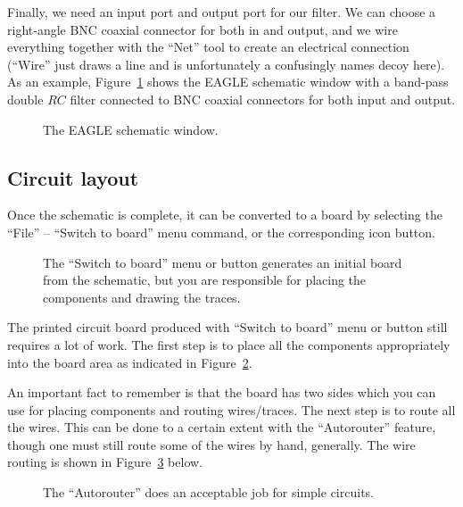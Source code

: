 \documentclass{article}
\begin{document}
Finally, we need an input port and output port for our filter.  We can choose a right-angle BNC coaxial connector for both in and output, and we wire everything together with the ``Net'' tool to create an electrical connection (``Wire'' just draws a line and is unfortunately a confusingly names decoy here).  As an example, Figure~\ref{fig:eagle:schematic_bandpass} shows the EAGLE schematic window with a band-pass double $RC$ filter connected to BNC coaxial connectors for both input and output.

\begin{figure}
\begin{center}
\end{center}
\caption{The EAGLE schematic window.}
\label{fig:eagle:schematic_bandpass}
\end{figure}

\subsection{Circuit layout}
Once the schematic is complete, it can be converted to a board by selecting the ``File'' -- ``Switch to board'' menu command, or the corresponding icon button.  

\begin{figure}
\begin{center}
\end{center}
\caption{The ``Switch to board'' menu or button generates an initial board from the schematic, but you are responsible for placing the components and drawing the traces.}
\label{fig:eagle:board_start}
\end{figure}

The printed circuit board produced with ``Switch to board'' menu or button still requires a lot of work. The first step is to place all the components appropriately into the board area as indicated in Figure~\ref{fig:eagle:board_start}.  

An important fact to remember is that the board has two sides which you can use for placing components and routing wires/traces. The next step is to route all the wires. This can be done to a certain extent with the ``Autorouter'' feature, though one must still route some of the wires by hand, generally. The wire routing is shown in Figure~\ref{fig:eagle:board_autorouter} below.

\begin{figure}
\begin{center}
\end{center}
\caption{The ``Autorouter'' does an acceptable job for simple circuits.}
\label{fig:eagle:board_autorouter}
\end{figure}
\end{document}
